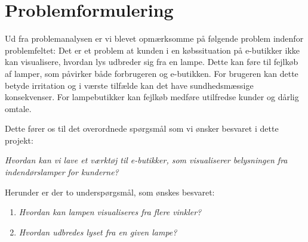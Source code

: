 \section{Problemformulering}

Ud fra problemanalysen er vi blevet opmærksomme på følgende problem indenfor problemfeltet:
Det er et problem at kunden i en købssituation på e-butikker ikke kan visualisere, hvordan lys udbreder sig fra en lampe. Dette kan føre til fejlkøb af lamper, som påvirker både forbrugeren og e-butikken. For brugeren kan dette betyde irritation og i værste tilfælde kan det have sundhedsmæssige konsekvenser. For lampebutikker kan fejlkøb medføre utilfredse kunder og dårlig omtale. 

Dette fører os til det overordnede spørgsmål som vi ønsker besvaret i dette projekt:

\textit{Hvordan kan vi lave et værktøj til e-butikker, som visualiserer belysningen fra indendørslamper for kunderne?}

Herunder er der to underspørgsmål, som ønskes besvaret:

\begin{enumerate}

\item \textit{Hvordan kan lampen visualiseres fra flere vinkler?}
\item \textit{Hvordan udbredes lyset fra en given lampe?}

\end{enumerate}

\clearpage